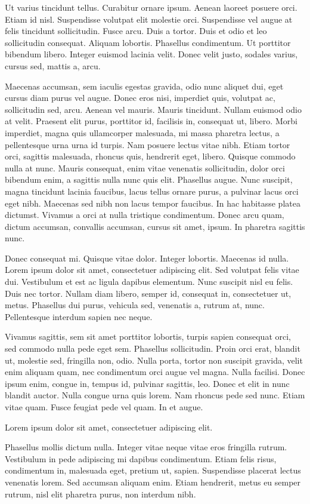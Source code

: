 \documentclass[../hdr.tex]{subfiles}
\begin{document}
Ut varius tincidunt tellus. Curabitur ornare ipsum. Aenean laoreet posuere orci.
Etiam id nisl. Suspendisse volutpat elit molestie orci. Suspendisse vel augue at
felis tincidunt sollicitudin. Fusce arcu. Duis a tortor. Duis et odio et leo
sollicitudin consequat. Aliquam lobortis. Phasellus condimentum. Ut porttitor
bibendum libero. Integer euismod lacinia velit. Donec velit justo, sodales
varius, cursus sed, mattis a, arcu.

Maecenas accumsan, sem iaculis egestas gravida, odio nunc aliquet dui, eget
cursus diam purus vel augue. Donec eros nisi, imperdiet quis, volutpat ac,
sollicitudin sed, arcu. Aenean vel mauris. Mauris tincidunt. Nullam euismod odio
at velit. Praesent elit purus, porttitor id, facilisis in, consequat ut, libero.
Morbi imperdiet, magna quis ullamcorper malesuada, mi massa pharetra lectus, a
pellentesque urna urna id turpis. Nam posuere lectus vitae nibh. Etiam tortor
orci, sagittis malesuada, rhoncus quis, hendrerit eget, libero. Quisque commodo
nulla at nunc. Mauris consequat, enim vitae venenatis sollicitudin, dolor orci
bibendum enim, a sagittis nulla nunc quis elit. Phasellus augue. Nunc suscipit,
magna tincidunt lacinia faucibus, lacus tellus ornare purus, a pulvinar lacus
orci eget nibh. Maecenas sed nibh non lacus tempor faucibus. In hac habitasse
platea dictumst. Vivamus a orci at nulla tristique condimentum. Donec arcu quam,
dictum accumsan, convallis accumsan, cursus sit amet, ipsum. In pharetra
sagittis nunc.

Donec consequat mi. Quisque vitae dolor. Integer lobortis. Maecenas id nulla.
Lorem ipsum dolor sit amet, consectetuer adipiscing elit. Sed volutpat felis
vitae dui. Vestibulum et est ac ligula dapibus elementum. Nunc suscipit nisl eu
felis. Duis nec tortor. Nullam diam libero, semper id, consequat in,
consectetuer ut, metus. Phasellus dui purus, vehicula sed, venenatis a, rutrum
at, nunc. Pellentesque interdum sapien nec neque.

Vivamus sagittis, sem sit amet porttitor lobortis, turpis sapien consequat orci,
sed commodo nulla pede eget sem. Phasellus sollicitudin. Proin orci erat,
blandit ut, molestie sed, fringilla non, odio. Nulla porta, tortor non suscipit
gravida, velit enim aliquam quam, nec condimentum orci augue vel magna. Nulla
facilisi. Donec ipsum enim, congue in, tempus id, pulvinar sagittis, leo. Donec
et elit in nunc blandit auctor. Nulla congue urna quis lorem. Nam rhoncus pede
sed nunc. Etiam vitae quam. Fusce feugiat pede vel quam. In et augue.

Lorem ipsum dolor sit amet, consectetuer adipiscing elit.

Phasellus mollis dictum nulla. Integer vitae neque vitae eros fringilla rutrum.
Vestibulum in pede adipiscing mi dapibus condimentum. Etiam felis risus,
condimentum in, malesuada eget, pretium ut, sapien. Suspendisse placerat lectus
venenatis lorem. Sed accumsan aliquam enim. Etiam hendrerit, metus eu semper
rutrum, nisl elit pharetra purus, non interdum nibh.



\ifSubfilesClassLoaded{%
\printbibliography
}{%
  \vskip2cm
}
\end{document}
